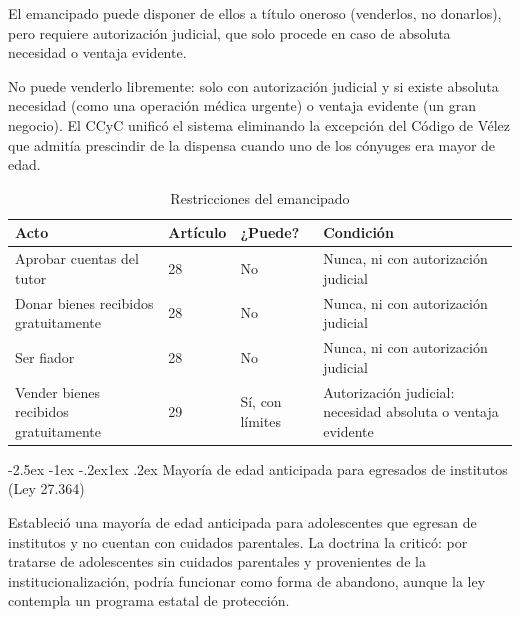\documentclass[12pt,oneside]{book}
\makeatletter
\renewcommand\subsection{\@startsection{subsection}{2}{\z@}%
  {-2.5ex \@plus -1ex \@minus -.2ex}{1ex \@plus .2ex}%
  {\normalfont\normalsize\bfseries}}
\makeatother
\begin{document}
\begin{regla}
El emancipado puede disponer de ellos a título oneroso (venderlos, no donarlos), pero requiere autorización judicial, que solo procede en caso de absoluta necesidad o ventaja evidente.
\end{regla}

\begin{ejemplo}
No puede venderlo libremente: solo con autorización judicial y si existe absoluta necesidad (como una operación médica urgente) o ventaja evidente (un gran negocio). El CCyC unificó el sistema eliminando la excepción del Código de Vélez que admitía prescindir de la dispensa cuando uno de los cónyuges era mayor de edad.
\end{ejemplo}

\begin{table}[H]
\centering
\begin{tabularx}{\textwidth}{Y B{0.14\textwidth} B{0.16\textwidth} Y}
\toprule
\textbf{Acto} & \textbf{Artículo} & \textbf{¿Puede?} & \textbf{Condición} \\
\midrule
Aprobar cuentas del tutor & 28 & No & Nunca, ni con autorización judicial \\
Donar bienes recibidos gratuitamente & 28 & No & Nunca, ni con autorización judicial \\
Ser fiador & 28 & No & Nunca, ni con autorización judicial \\
Vender bienes recibidos gratuitamente & 29 & Sí, con límites & Autorización judicial: necesidad absoluta o ventaja evidente \\
\bottomrule
\end{tabularx}
\caption{Restricciones del emancipado}
\end{table}

\subsection{Mayoría de edad anticipada para egresados de institutos (Ley 27.364)}

Estableció una mayoría de edad anticipada para adolescentes que egresan de institutos y no cuentan con cuidados parentales. La doctrina la criticó: por tratarse de adolescentes sin cuidados parentales y provenientes de la institucionalización, podría funcionar como forma de abandono, aunque la ley contempla un programa estatal de protección.
\end{document}
